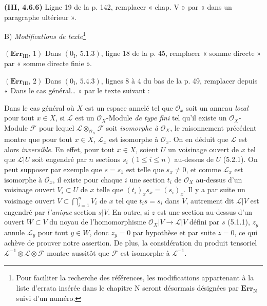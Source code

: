 \noindent\textbf{(III, 4.6.6)} Ligne 19 de la p. 142, remplacer « chap. V » par
« dans un paragraphe ultérieur ».

\begin{center}
B) \emph{Modifications de texte}\footnote{Pour faciliter la recherche des
références, les modifications appartenant à la liste d'errata insérée dans le
chapitre N seront désormais désignées par $\mathbf{Err}_{\mathrm N}$ suivi d'un
numéro.}
\end{center}

\noindent\textbf{$(\mathbf{Err}_{\mathrm{III}},\,1)$} Dans
$(0_{\mathrm I},\,5.1.3)$, ligne 18 de la p. 45, remplacer « somme directe »
par « somme directe finie ».

\noindent\textbf{$(\mathbf{Err}_{\mathrm{III}},\,2)$} Dans
$(0_{\mathrm I},\,5.4.3)$, lignes 8 à 4 du bas de la p. 49, remplacer depuis
« Dans le cas général\ldots{} » par le texte suivant :

Dans le cas général où $X$ est un espace annelé tel que $\mathscr O_x$ soit un
anneau \emph{local} pour
tout $x\in X$, si $\mathscr L$ est un $\mathscr O_X$-Module \emph{de type fini}
tel qu'il existe un $\mathscr O_X$-Module $\mathscr F$ pour lequel
$\mathscr L\otimes_{\mathscr O_X}\mathscr F$ soit \emph{isomorphe à}
$\mathscr O_X$, le raisonnement précédent montre que pour tout $x\in X$,
$\mathscr L_x$ est isomorphe à $\mathscr O_x$. On en déduit que $\mathscr L$ est
alors \emph{inversible}. En effet, pour tout $x\in X$, soient $U$ un voisinage
ouvert de $x$ tel que $\mathscr L|U$ soit engendré par $n$ sections
$s_i\ (1\leq i\leq n)$ au-dessus de $U$ (5.2.1). On peut supposer par exemple
que $s=s_1$ est telle que $s_x\ne0$, et comme $\mathscr L_x$ est isomorphe à
$\mathscr O_x$, il existe pour chaque $i$ une section $t_i$ de $\mathscr O_X$
au-dessus d'un voisinage ouvert $V_i\subset U$ de $x$ telle que
$(t_i)_x s_x=(s_i)_x$. Il y a par suite un voisinage ouvert
$V\subset\bigcap_{i=1}^nV_i$ de $x$ tel que $t_i s=s_i$ dans $V$, autrement
dit $\mathscr L|V$ est engendré par \emph{l'unique} section $s|V$. En outre,
si $z$ est une section au-dessus d'un ouvert $W\subset V$ du noyau de
l'homomorphisme $\mathscr O_X|V\to\mathscr L|V$ défini par $s$ (5.1.1), $z_y$
annule $\mathscr L_y$ pour tout $y\in W$, donc $z_y=0$ par hypothèse et par
suite $z=0$, ce qui achève de prouver notre assertion. De plus, la
considération du produit tensoriel
$\mathscr L^{-1}\otimes\mathscr L\otimes\mathscr F$ montre aussitôt que
$\mathscr F$ est isomorphe à $\mathscr L^{-1}$.

